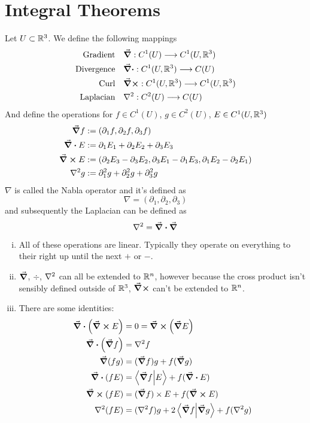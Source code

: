 \documentclass[../../script.tex]{subfiles}
\begin{document}
\section{Integral Theorems}

\begin{defi}
    Let $U \subset \mathbb{R}^3$. We define the following mappings
    \begin{align*}
        \text{Gradient} \quad & \grad: C^1(U) \longrightarrow C^1(U, \realn^3)\\
        \text{Divergence} \quad & \div: C^1(U, \realn^3) \longrightarrow C(U)\\
        \text{Curl} \quad & \curl: C^1(U, \realn^3) \longrightarrow C^1(U, \realn^3) \\
        \text{Laplacian} \quad &\laplacian: C^2(U) \longrightarrow C(U)
    \end{align*}
    And define the operations for $f \in C^1(U)$, $g \in C^2(U)$, $E \in C^1(U, \mathbb{R}^3)$
    \begin{align*}
        \grad f &:= (\partial_1 f, \partial_2 f, \partial_3 f) \\
        \div E &:= \partial_1 E_1 + \partial_2 E_2 + \partial_3 E_3 \\
        \curl E &:= (\partial_2 E_3 - \partial_3 E_2, \partial_3 E_1 - \partial_1 E_3, \partial_1 E_2 - \partial_2 E_1) \\
        \laplacian g &:= \partial_1^2 g + \partial_2^2 g + \partial_3^2 g
    \end{align*}
    $\nabla$ is called the Nabla operator and it's defined as 
    \[
        \nabla = (\partial_1, \partial_2, \partial_3)
    \]
    and subsequently the Laplacian can be defined as 
    \[
        \laplacian = \div \grad
    \]
\end{defi}

\begin{rem}
    \begin{enumerate}[(i)]
        \item All of these operations are linear. Typically they operate on everything to their right up until the next $+$ or $-$.
        \item $\grad$, $\div$, $\laplacian$ can all be extended to $\mathbb{R}^n$, however because the cross product isn't sensibly defined outside of $\mathbb{R}^3$, $\curl$ can't be extended to $\mathbb{R}^n$.
        \item There are some identities:
        \begin{align*}
            \div (\curl E) &= 0 = \curl (\grad E) \\
            \div (\grad f) &= \laplacian f \\
            \grad (f g) &= (\grad f) g + f (\grad g) \\
            \div (f E) &= \innerproduct{\grad f}{E} + f (\div E) \\
            \curl (f E) &= (\grad f) \times E + f (\curl E) \\
            \laplacian (f E) &= (\laplacian f) g + 2 \innerproduct{\grad f}{\grad g} + f (\laplacian g)
        \end{align*}
    \end{enumerate}
\end{rem}
\end{document}
